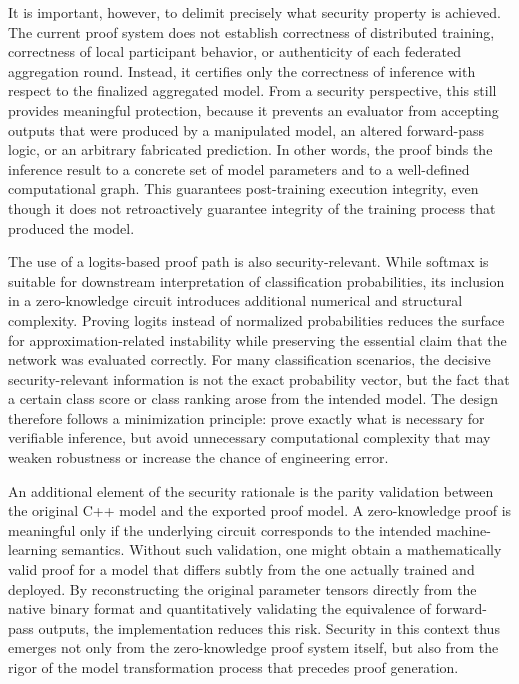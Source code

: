 It is important, however, to delimit precisely what security property is achieved. The current proof system does not establish correctness of distributed training, correctness of local participant behavior, or authenticity of each federated aggregation round. Instead, it certifies only the correctness of inference with respect to the finalized aggregated model. From a security perspective, this still provides meaningful protection, because it prevents an evaluator from accepting outputs that were produced by a manipulated model, an altered forward-pass logic, or an arbitrary fabricated prediction. In other words, the proof binds the inference result to a concrete set of model parameters and to a well-defined computational graph. This guarantees post-training execution integrity, even though it does not retroactively guarantee integrity of the training process that produced the model.

The use of a logits-based proof path is also security-relevant. While softmax is suitable for downstream interpretation of classification probabilities, its inclusion in a zero-knowledge circuit introduces additional numerical and structural complexity. Proving logits instead of normalized probabilities reduces the surface for approximation-related instability while preserving the essential claim that the network was evaluated correctly. For many classification scenarios, the decisive security-relevant information is not the exact probability vector, but the fact that a certain class score or class ranking arose from the intended model. The design therefore follows a minimization principle: prove exactly what is necessary for verifiable inference, but avoid unnecessary computational complexity that may weaken robustness or increase the chance of engineering error.

An additional element of the security rationale is the parity validation between the original C++ model and the exported proof model. A zero-knowledge proof is meaningful only if the underlying circuit corresponds to the intended machine-learning semantics. Without such validation, one might obtain a mathematically valid proof for a model that differs subtly from the one actually trained and deployed. By reconstructing the original parameter tensors directly from the native binary format and quantitatively validating the equivalence of forward-pass outputs, the implementation reduces this risk. Security in this context thus emerges not only from the zero-knowledge proof system itself, but also from the rigor of the model transformation process that precedes proof generation.

